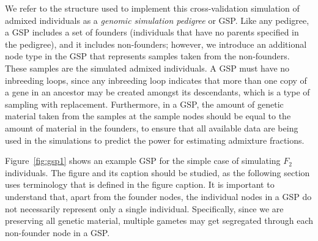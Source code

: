 We refer to the structure used to implement this cross-validation simulation
of admixed individuals as
a {\em genomic simulation pedigree} or GSP.  Like any pedigree,
a GSP includes a set of founders (individuals that have no parents specified in the
pedigree), and it includes non-founders; however, we introduce an additional node
type in the GSP that represents samples taken from the non-founders. These samples
are the simulated admixed individuals.  A GSP must have no inbreeding loops, since
any inbreeding loop indicates that more than one copy of a gene in an ancestor may
be created amongst its descendants, which is a type of sampling with
replacement.  Furthermore, in a GSP, the amount of genetic material taken from the
samples at the sample nodes should be equal to the amount of material in the founders,
to ensure that all available data are being used in the simulations to predict the power for
estimating admixture fractions.

Figure~\ref{fig:gsp1} shows an example GSP for the simple case
of simulating $F_2$ individuals. The figure and its caption
should be studied, as the following section
uses terminology that is defined in the figure caption.
It is important to understand that, apart from the founder nodes, the individual
nodes in a GSP do not necessarily represent only a single individual.  Specifically,
since we are preserving all genetic material, multiple gametes may get segregated
through each non-founder node in a GSP\@.


